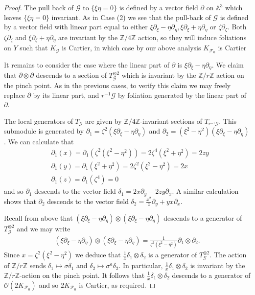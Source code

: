 \documentclass[12pt, a4paper]{amsart}
\theoremstyle{definition}
\theoremstyle{named}
\begin{document}
\begin{proof}
The pull back of  $\mathcal G$
to $\{\xi\eta = 0\}$ is defined by a vector field 
$\partial$ on $\mathbb A^3$ which leaves 
$\{\xi \eta = 0\}$ invariant.  
As in Case (2)
we see that the pull-back of $\mathcal G$ is defined by a vector field with linear part equal to either 
$\xi\partial_\xi-\eta\partial_\eta, \xi\partial_\xi+\eta\partial_\eta$ or $\zeta\partial_\zeta$.
Both $\zeta\partial_\zeta$ and $\xi\partial_\xi+\eta\partial_\eta$
are invariant by the $\mathbb Z/4\mathbb Z$ action, 
so they will induce foliations on $Y$ such that $K_{\mathcal G}$ is Cartier, in which case by our above analysis $K_{\mathcal F_0}$ is Cartier

It remains to consider the case 
where the linear part of $\partial$ is 
$\xi\partial_\xi-\eta\partial_\eta$. 
We claim that $\partial \otimes \partial$ descends to a section of $T^{\otimes 2}_{\mathcal G}$ which is invariant by the $\mathbb Z/r\mathbb Z$ action on the pinch point.  As in the previous cases, to verify this claim we may freely replace $\partial$ by its linear part, and $r^{-1}\mathcal G$ by foliation generated by the linear part of $\partial$.

The local generators of $T_{\mathcal G}$ are given by  
$\mathbb Z/4\mathbb Z$-invariant sections of $T_{r^{-1}\mathcal G}$.  This submodule is generated by $\partial_1 = \zeta^2(\xi\partial_\xi-\eta\partial_\eta)$ and $\partial_2 = (\xi^2-\eta^2)(\xi\partial_\xi-\eta\partial_\eta)$.
We can calculate that 
\begin{align*}
&\partial_1(x) = \partial_1(\zeta^2(\xi^2-\eta^2)) = 2\zeta^4(\xi^2+\eta^2) = 2zy \\
&\partial_1(y) = \partial_1(\xi^2+\eta^2) = 2\zeta^2(\xi^2-\eta^2) = 2x \\
&\partial_1(z) = \partial_1(\zeta^4)  = 0
\end{align*}
and so $\partial_1$ descends to the vector field $\delta_1 = 2x\partial_y + 2zy\partial_x$.
A similar calculation shows that  $\partial_2$ descends to the vector field 
$\delta_2 = \frac{x^2}{z}\partial_y+yx\partial_x$.

Recall from above that $(\xi\partial_\xi-\eta\partial_\eta)\otimes (\xi\partial_\xi-\eta\partial_\eta)$ descends to a generator of $T_{\mathcal G}^{\otimes 2}$ and we may write
\begin{align*}(\xi\partial_\xi-\eta\partial_\eta)\otimes (\xi\partial_\xi-\eta\partial_\eta) = \frac{1}{\zeta^2(\xi^2-\eta^2)}\partial_1\otimes \partial_2.\end{align*} 
Since $x = \zeta^2(\xi^2-\eta^2)$ we deduce that $\frac{1}{x}\delta_1\otimes\delta_2$ is a generator of  $T_{\mathcal G}^{\otimes 2}$.
The action of $\mathbb Z/r\mathbb Z$ 
sends $\delta_1 \mapsto \sigma \delta_1$ and $\delta_2 \mapsto \sigma^a \delta_2$.  In particular, $\frac{1}{x}\delta_1\otimes\delta_2$ is invariant by the $\mathbb Z/r\mathbb Z$-action on the pinch point.
It follows that $\frac{1}{x}\delta_1\otimes\delta_2$
descends to a generator of $\mathcal O(2K_{\mathcal F_0})$
and so $2K_{\mathcal F_0}$ is Cartier, as required.
\end{proof}
\end{document}
